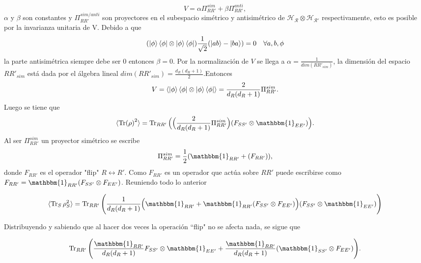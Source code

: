 \begin{equation}
V= \alpha \Pi_{RR'}^{sim} + \beta \Pi_{RR'}^{anti},
\end{equation}
$\alpha$ y $\beta$ son constantes y $\Pi_{RR'}^{sim/anti}$ son proyectores en el subespacio simétrico y antisimétrico de $\mathcal{H_{R} \otimes H_{R'}}$ respectivamente, esto es posible por la invarianza unitaria de V. Debido a que 	
\begin{equation}
(\ket{\phi} \bra{\phi} \otimes \ket{\phi} \bra{\phi})\frac{1}{\sqrt{2}} ( \ket{ab} -\ket{ba})=0  \quad  \forall a,b,\phi
\end{equation}
la parte antisimétrica siempre debe ser 0 entonces $\beta=0$. Por la normalización de $V$ se llega a $\alpha= \frac{1}{dim(RR'_{sim})}$, la dimensión del espacio $RR'_{sim}$ está dada por el álgebra lineal $dim(RR'_{sim})= \frac{d_{R}(d_{R}+1)}{2}$.Entonces
\begin{equation}
V= \langle \ket{\phi} \bra{\phi} \otimes \ket{\phi} \bra{\phi} \rangle = \frac{2}{d_{R}(d_{R} +1)} \Pi_{RR'}^{sim}.
\end{equation}
Luego se tiene que 
\begin{equation}
\langle \Tr (\rho)^{2} \rangle = \Tr_{RR'} \Big( \Big( \frac{2}{d_{R}(d_{R} +1)} \Pi_{RR'}^{sim} \Big)(F_{SS'} \otimes \mathbbm{1}_{EE'}) \Big).
\end{equation}
Al ser $\Pi_{RR'}^{sim}$ un proyector simétrico se escribe
\begin{equation}
\Pi_{RR'}^{sim}=\frac{1}{2}(\mathbbm{1}_{RR'}+(F_{RR'} )),
\end{equation}
donde $F_{RR'}$ es el operador "flip"  $R \longleftrightarrow R'$. Como $F_{RR'}$ es un operador que actúa sobre $RR'$ puede escribirse como $F_{RR'}= \mathbbm{1}_{RR'}(F_{SS'} \otimes F_{EE'})$. Reuniendo todo lo anterior

\begin{equation}
\langle \Tr_{S} \rho_{S}^2 \rangle = \Tr_{RR'} \Bigg( \frac{1}{d_{R}(d_{R}+1)} \Big( \mathbbm{1}_{RR'}+\mathbbm{1}_{RR'}(F_{SS'} \otimes F_{EE'}) \Big)  (F_{SS'}\otimes \mathbbm{1}_{EE'})   \Bigg)
\end{equation}

Distribuyendo y sabiendo que al hacer dos veces la operación ``flip" no se afecta nada, se sigue que

\begin{equation}
\Tr_{RR'} \Bigg( \frac{\mathbbm{1}_{RR'}}{d_{R}(d_{R}+1)} F_{SS'} \otimes \mathbbm{1}_{EE'} + \frac{\mathbbm{1}_{RR'}}{d_{R}(d_{R}+1)} (\mathbbm{1}_{SS'} \otimes F_{EE'})  \Bigg).
\end{equation}

